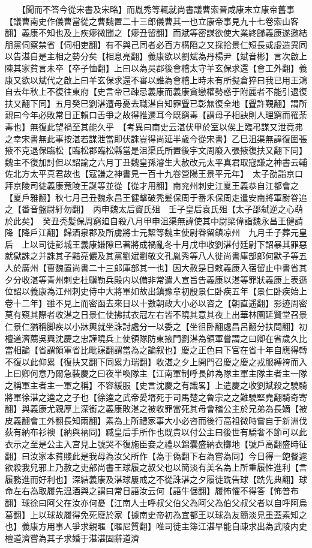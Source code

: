 　　【聞而不答今從宋書及宋略】而胤秀等輒就尚書議曹索晉咸康末立康帝舊事【議曹南史作儀曹當從之曹魏置二十三郎儀曹其一也立康帝事見九十七卷索山客翻】義康不知也及上疾瘳微聞之【瘳丑留翻】而斌等密謀欲使大業終歸義康遂邀結朋黨伺察禁省【伺相吏翻】有不與己同者必百方構䧟之又採拾景仁短長或虛造異同以告湛自是主相之勢分矣【相息亮翻】義康欲以劉斌為丹楊尹【斌音彬】言次啟上陳其家貧言未卒【卒子恤翻】上曰以為吳郡後會稽太守羊玄保求還【會工外翻】義康又欲以斌代之啟上曰羊玄保求還不審以誰為會稽上時未有所擬倉猝曰我已用王鴻自去年秋上不復往東府【史言帝已疎忌義康而義康貪戀權勢惑于附麗者不能引退復扶又翻下同】五月癸巳劉湛遭母憂去職湛自知罪舋已彰無復全地【舋許覲翻】謂所親曰今年必敗常日正賴口舌爭之故得推遷耳今既窮毒【謂母子相訣則人理窮而罹荼毒也】無復此望禍至其能久乎　【考異曰南史云湛伏甲於室以俟上臨弔謀又泄竟弗之幸宋書無此事按湛若謀泄當即伏誅豈得尚延半歲今從宋書】乙巳沮渠無諱復圍張掖不克退保臨松【臨松郡臨松縣當是沮渠氏所置後宇文周廢入張掖復扶又翻下同】魏主不復加討但以詔諭之六月丁丑魏皇孫濬生大赦改元太平真君取寇謙之神書云輔佐北方太平真君故也【寇謙之神書見一百十九卷營陽王景平元年】　太子劭詣京口拜京陵司徒義康竟陵王誕等並從【從才用翻】南兖州刺史江夏王義恭自江都會之【夏戶雅翻】秋七月己丑魏永昌王健擊破秃髪保周于番禾保周走遣安南將軍尉眷追之【番音盤尉紆勿翻】　丙申魏太后竇氏殂　壬子皇后袁氏殂【太子邵弑逆之心萌於此矣】　癸丑秃髪保周窮廹自殺八月甲申沮渠無諱使其中尉梁偉詣魏永昌王健請降【降戶江翻】歸酒泉郡及所虜將士元絜等魏主使尉眷留鎮凉州　九月壬子葬元皇后　上以司徒彭城王義康嫌隙已著將成禍亂冬十月戊申收劉湛付廷尉下詔暴其罪惡就獄誅之并誅其子黯亮儼及其黨劉斌劉敬文孔胤秀等八人徙尚書庫部郎何默子等五人於廣州【曹魏置尚書二十三郎庫部其一也】因大赦是日敕義康入宿留止中書省其夕分收湛等青州刺史杜驥勒兵殿内以備非常遣人宣旨告義康以湛等罪狀義康上表遜位詔以義康為江州刺史侍中大將軍如故出鎮豫章初殷景仁卧疾五年【景仁卧疾始上卷十二年】雖不見上而密函去來日以十數朝政大小必以咨之【朝直遥翻】影迹周密莫有窺其際者收湛之日景仁使拂拭衣冠左右皆不曉其意其夜上出華林園延賢堂召景仁景仁猶稱脚疾以小牀輿就坐誅討處分一以委之【坐徂卧翻處昌呂翻分扶問翻】初檀道濟薦吳興沈慶之忠謹曉兵上使領隊防東掖門劉湛為領軍嘗謂之曰卿在省歲久比當相論【省謂領軍省比毗寐翻謂當為之論叙也】慶之正色曰下官在省十年自應得轉不復以此仰累【復扶又翻下同累力瑞翻】收湛之夕上開門召慶之慶之戎服縛袴而入上曰卿何意乃爾急裝慶之曰夜半喚隊主【江南軍制呼長帥為隊主軍主隊主者主一隊之稱軍主者主一軍之稱】不容緩服【史言沈慶之有識畧】上遣慶之收劉斌殺之驍騎將軍徐湛之逵之之子也【徐逵之武帝愛壻死于司馬楚之魯宗之之難驍堅堯翻騎奇寄翻】與義康尤親厚上深銜之義康敗湛之被收罪當死其母會稽公主於兄弟為長嫡【被皮義翻會工外翻長知兩翻】素為上所禮家事大小必咨而後行高祖微時嘗自于新洲伐荻有納布衫襖【納與衲同】臧皇后手所作也既貴以付公主曰後世有驕奢不節可以此衣示之至是公主入宫見上號哭不復施臣妾之禮以錦囊盛納衣擲地【號戶高翻盛時征翻】曰汝家本貧賤此是我母為汝父所作【為于偽翻下右為嘗為同】今日得一飽餐遽欲殺我兒邪上乃赦之吏部尚書王球履之叔父也以簡淡有美名為上所重履性進利【言履務進而好利也】深結義康及湛球屢戒之不從誅湛之夕履徒跣告球【跣先典翻】球命左右為取履先温酒與之謂曰常日語汝云何【語牛倨翻】履怖懼不得答【怖普布翻】球徐曰阿父在汝亦何憂【江南人士呼叔父伯父為阿父為伯父叔父者以自呼阿烏葛翻】上以球故履得免死廢於家【據南史帝初為宜都王以球為友簡淡見重蓋素知之也】義康方用事人爭求親暱【暱尼質翻】唯司徒主簿江湛早能自疎求出為武陵内史檀道濟嘗為其子求婚于湛湛固辭道濟